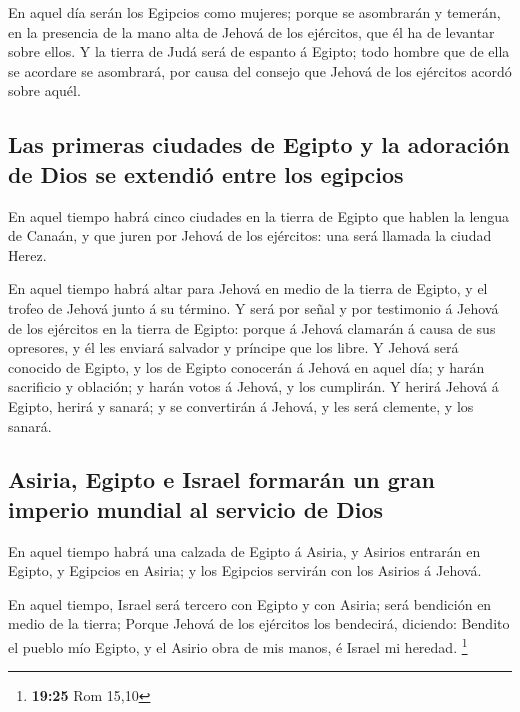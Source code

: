  En aquel día serán los Egipcios como mujeres; porque se
asombrarán y temerán, en la presencia de la mano alta de Jehová de los
ejércitos, que él ha de levantar sobre ellos.  Y la
tierra de Judá será de espanto á Egipto; todo hombre que de ella se
acordare se asombrará, por causa del consejo que Jehová de los ejércitos
acordó sobre aquél.

\hypertarget{las-primeras-ciudades-de-egipto-y-la-adoraciuxf3n-de-dios-se-extendiuxf3-entre-los-egipcios}{%
\subsection{Las primeras ciudades de Egipto y la adoración de Dios se
extendió entre los
egipcios}\label{las-primeras-ciudades-de-egipto-y-la-adoraciuxf3n-de-dios-se-extendiuxf3-entre-los-egipcios}}

 En aquel tiempo habrá cinco ciudades en la tierra de
Egipto que hablen la lengua de Canaán, y que juren por Jehová de los
ejércitos: una será llamada la ciudad Herez.

 En aquel tiempo habrá altar para Jehová en medio de la
tierra de Egipto, y el trofeo de Jehová junto á su término.
 Y será por señal y por testimonio á Jehová de los
ejércitos en la tierra de Egipto: porque á Jehová clamarán á causa de
sus opresores, y él les enviará salvador y príncipe que los libre.
 Y Jehová será conocido de Egipto, y los de Egipto
conocerán á Jehová en aquel día; y harán sacrificio y oblación; y harán
votos á Jehová, y los cumplirán.  Y herirá Jehová á
Egipto, herirá y sanará; y se convertirán á Jehová, y les será clemente,
y los sanará.

\hypertarget{asiria-egipto-e-israel-formaruxe1n-un-gran-imperio-mundial-al-servicio-de-dios}{%
\subsection{Asiria, Egipto e Israel formarán un gran imperio mundial al
servicio de
Dios}\label{asiria-egipto-e-israel-formaruxe1n-un-gran-imperio-mundial-al-servicio-de-dios}}

 En aquel tiempo habrá una calzada de Egipto á Asiria, y
Asirios entrarán en Egipto, y Egipcios en Asiria; y los Egipcios
servirán con los Asirios á Jehová.

 En aquel tiempo, Israel será tercero con Egipto y con
Asiria; será bendición en medio de la tierra;  Porque
Jehová de los ejércitos los bendecirá, diciendo: Bendito el pueblo mío
Egipto, y el Asirio obra de mis manos, é Israel mi heredad. \footnote{\textbf{19:25}
  Rom 15,10}

